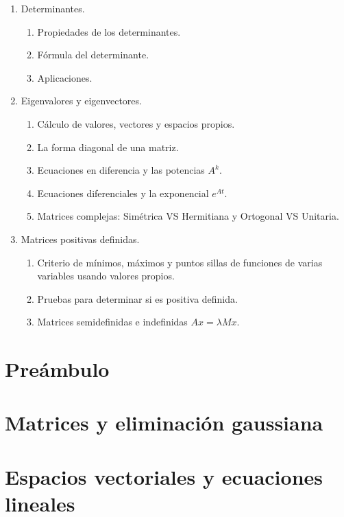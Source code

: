 \documentclass[8pt]{article}
\begin{document}
\begin{multicols}{2}
\begin{enumerate}
\begin{enumerate}
        \end{enumerate}
        \item Determinantes.
        \begin{enumerate}
            \item Propiedades de los determinantes. 
            \item Fórmula del determinante.
            \item Aplicaciones.
        \end{enumerate}
        \item Eigenvalores y eigenvectores.
        \begin{enumerate}
            \item Cálculo de valores, vectores y espacios propios.
            \item La forma diagonal de una matriz.
            \item Ecuaciones en diferencia y las potencias $A^k$.
            \item Ecuaciones diferenciales y la exponencial $e^{At}$.
            \item Matrices complejas: Simétrica VS Hermitiana y Ortogonal VS Unitaria.
        \end{enumerate}
        \item Matrices positivas definidas.
        \begin{enumerate}
            \item Criterio de mínimos, máximos y puntos sillas de funciones de varias variables usando valores propios.
            \item Pruebas para determinar si es positiva definida.
            \item Matrices semidefinidas e indefinidas $Ax=\lambda Mx$.
        \end{enumerate}
    \end{enumerate}
\end{multicols}



\section*{Preámbulo}
\label{sec:preambulo}


\pagebreak


\section{Matrices y eliminación gaussiana}
\label{sec:matrices_y_eliminacion_gaussiana}


\pagebreak


\section{Espacios vectoriales y ecuaciones lineales}
\label{sec:espacios_vectoriales_y_ecuaciones_lineales}


\pagebreak
\end{document}
